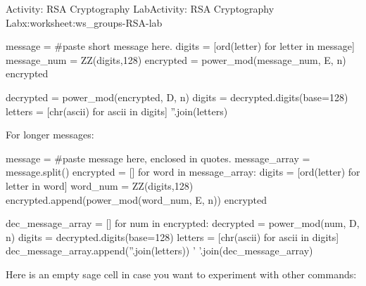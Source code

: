 \documentclass[11pt]{book}
\begin{document}
\begin{worksheet-section}{Activity: RSA Cryptography Lab}{}{Activity: RSA Cryptography Lab}{}{}{x:worksheet:ws_groups-RSA-lab}
\begin{sageinput}
message = #paste short message here.
digits = [ord(letter) for letter in message]
message_num = ZZ(digits,128)
encrypted = power_mod(message_num, E, n)
encrypted
\end{sageinput}
\begin{sageinput}
decrypted = power_mod(encrypted, D, n)
digits = decrypted.digits(base=128)
letters = [chr(ascii) for ascii in digits]
''.join(letters)
\end{sageinput}
For longer messages:%
\begin{sageinput}
message = #paste message here, enclosed in quotes.
message_array = message.split()
encrypted = []
for word in message_array:
    digits = [ord(letter) for letter in word]
    word_num = ZZ(digits,128)
    encrypted.append(power_mod(word_num, E, n))
encrypted
\end{sageinput}
\begin{sageinput}
dec_message_array = []
for num in encrypted:
    decrypted = power_mod(num, D, n)
    digits = decrypted.digits(base=128)
    letters = [chr(ascii) for ascii in digits]
    dec_message_array.append(''.join(letters))
' '.join(dec_message_array)
\end{sageinput}
Here is an empty sage cell in case you want to experiment with other commands:%
\end{worksheet-section}
\restoregeometry
\end{document}
